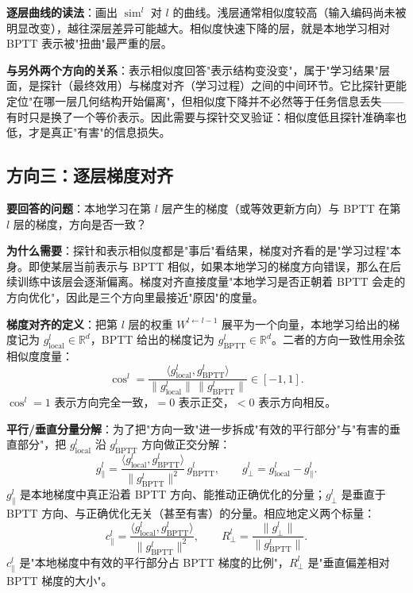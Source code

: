 \documentclass[journal,12pt,onecolumn]{IEEEtran}
\begin{document}
\textbf{逐层曲线的读法}：画出 $\operatorname{sim}^l$ 对 $l$ 的曲线。浅层通常相似度较高（输入编码尚未被明显改变），越往深层差异可能越大。相似度快速下降的层，就是本地学习相对 BPTT 表示被"扭曲"最严重的层。

\textbf{与另外两个方向的关系}：表示相似度回答"表示结构变没变"，属于"学习结果"层面，是探针（最终效用）与梯度对齐（学习过程）之间的中间环节。它比探针更能定位"在哪一层几何结构开始偏离"，但相似度下降并不必然等于任务信息丢失——有时只是换了一个等价表示。因此需要与探针交叉验证：相似度低且探针准确率也低，才是真正"有害"的信息损失。

\subsection{方向三：逐层梯度对齐}

\textbf{要回答的问题}：本地学习在第 $l$ 层产生的梯度（或等效更新方向）与 BPTT 在第 $l$ 层的梯度，方向是否一致？

\textbf{为什么需要}：探针和表示相似度都是"事后"看结果，梯度对齐看的是"学习过程"本身。即使某层当前表示与 BPTT 相似，如果本地学习的梯度方向错误，那么在后续训练中该层会逐渐偏离。梯度对齐直接度量"本地学习是否正朝着 BPTT 会走的方向优化"，因此是三个方向里最接近"原因"的度量。

\textbf{梯度对齐的定义}：把第 $l$ 层的权重 $W^{l\leftarrow l-1}$ 展平为一个向量，本地学习给出的梯度记为 $g^l_{\mathrm{local}}\in\mathbb R^d$，BPTT 给出的梯度记为 $g^l_{\mathrm{BPTT}}\in\mathbb R^d$。二者的方向一致性用余弦相似度度量：
\begin{equation}
\cos^l = \frac{\langle g^l_{\mathrm{local}}, g^l_{\mathrm{BPTT}}\rangle}{\|g^l_{\mathrm{local}}\|\,\|g^l_{\mathrm{BPTT}}\|}
\in[-1,1].
\end{equation}
$\cos^l=1$ 表示方向完全一致，$=0$ 表示正交，$<0$ 表示方向相反。

\textbf{平行/垂直分量分解}：为了把"方向一致"进一步拆成"有效的平行部分"与"有害的垂直部分"，把 $g^l_{\mathrm{local}}$ 沿 $g^l_{\mathrm{BPTT}}$ 方向做正交分解：
\begin{equation}
g^l_{\parallel} = \frac{\langle g^l_{\mathrm{local}}, g^l_{\mathrm{BPTT}}\rangle}{\|g^l_{\mathrm{BPTT}}\|^2}\,g^l_{\mathrm{BPTT}},
\qquad
g^l_{\perp} = g^l_{\mathrm{local}} - g^l_{\parallel}.
\end{equation}
$g^l_{\parallel}$ 是本地梯度中真正沿着 BPTT 方向、能推动正确优化的分量；$g^l_{\perp}$ 是垂直于 BPTT 方向、与正确优化无关（甚至有害）的分量。相应地定义两个标量：
\begin{equation}
c^l_{\parallel} = \frac{\langle g^l_{\mathrm{local}}, g^l_{\mathrm{BPTT}}\rangle}{\|g^l_{\mathrm{BPTT}}\|^2},
\qquad
R^l_{\perp} = \frac{\|g^l_{\perp}\|}{\|g^l_{\mathrm{BPTT}}\|}.
\end{equation}
$c^l_{\parallel}$ 是"本地梯度中有效的平行部分占 BPTT 梯度的比例"，$R^l_{\perp}$ 是"垂直偏差相对 BPTT 梯度的大小"。
\end{document}
